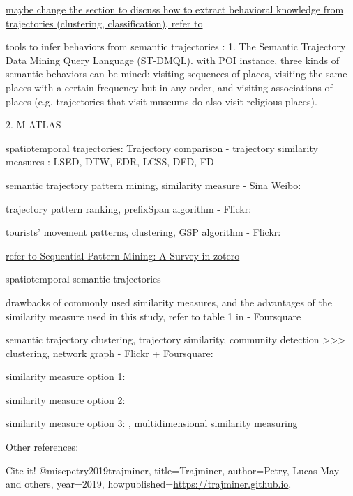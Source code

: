 \documentclass{article}
\begin{document}
\underline{maybe change the section to discuss how to extract behavioral knowledge from trajectories (clustering, classification), refer to \cite{parent_semantic_2013}}

tools to infer behaviors from semantic trajectories \cite{parent_semantic_2013}:
1. The Semantic Trajectory Data Mining Query Language (ST-DMQL). with POI instance, three kinds of semantic behaviors can be mined: visiting sequences of places, visiting the same places with a certain frequency but in any order, and visiting associations of places (e.g. trajectories that visit museums do also visit religious places).

2. M-ATLAS




spatiotemporal trajectories:
Trajectory comparison - trajectory similarity measures \cite{tao_comparative_2021}: LSED, DTW, EDR, LCSS, DFD, FD

semantic trajectory pattern mining, similarity measure - Sina Weibo: \cite{wan_semantic-geographic_2017}

trajectory pattern ranking, prefixSpan algorithm - Flickr:  \cite{yin_diversified_2011}

tourists' movement patterns, clustering, GSP algorithm - Flickr: \cite{hopken_flickr_2020}

\underline{refer to Sequential Pattern Mining: A Survey in zotero}

spatiotemporal semantic trajectories

drawbacks of commonly used similarity measures, and the advantages of the similarity measure used in this study, refer to table 1 in \cite{petry_towards_2019} - Foursquare

semantic trajectory clustering, trajectory similarity, community detection >>> clustering, network graph - Flickr + Foursquare: \cite{liu_stccd_2020}

similarity measure option 1:
\cite{petry_towards_2019}

similarity measure option 2:
\cite{ferrero_mastermovelets_2020}

similarity measure option 3:
\cite{furtado_multidimensional_2016}, multidimensional similarity measuring

Other references:
\cite{xiao_inferring_2014}

Cite it!
@misc{petry2019trajminer,
  title={Trajminer},
  author={Petry, Lucas May and others},
  year={2019},
  howpublished={\url{https://trajminer.github.io}},
}


\end{document}
